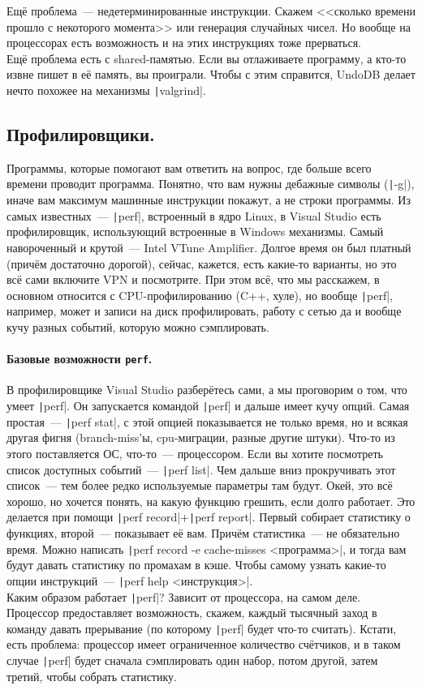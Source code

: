 \documentclass{article}
\begin{document}
    Ещё проблема~--- недетерминированные инструкции. Скажем <<сколько времени прошло с некоторого момента>> или генерация случайных чисел. Но вообще на процессорах есть возможность и на этих инструкциях тоже прерваться.\\
    Ещё проблема есть с shared-памятью. Если вы отлаживаете программу, а кто-то извне пишет в её память, вы проиграли. Чтобы с этим справится, UndoDB делает нечто похожее на механизмы \texttt|valgrind|.
    \subsection{Профилировщики.}
    Программы, которые помогают вам ответить на вопрос, где больше всего времени проводит программа. Понятно, что вам нужны дебажные символы (\texttt|-g|), иначе вам максимум машинные инструкции покажут, а не строки программы. Из самых известных~--- \texttt|perf|, встроенный в ядро Linux, в Visual Studio есть профилировщик, использующий встроенные в Windows механизмы. Самый навороченный и крутой~--- Intel VTune Amplifier. Долгое время он был платный (причём достаточно дорогой), сейчас, кажется, есть какие-то варианты, но это всё сами включите VPN и посмотрите. При этом всё, что мы расскажем, в основном относится с CPU-профилированию (C++, хуле), но вообще \texttt|perf|, например, может и записи на диск профилировать, работу с сетью да и вообще кучу разных событий, которую можно сэмплировать.
    \paragraph{Базовые возможности \texttt{perf}.}
    В профилировщике Visual Studio разберётесь сами, а мы проговорим о том, что умеет \texttt|perf|. Он запускается командой \texttt|perf| и дальше имеет кучу опций. Самая простая~--- \texttt|perf stat|, с этой опцией показывается не только время, но и всякая другая фигня (branch-miss'ы, cpu-миграции, разные другие штуки). Что-то из этого поставляется ОС, что-то~--- процессором. Если вы хотите посмотреть список доступных событий~--- \texttt|perf list|. Чем дальше вниз прокручивать этот список~--- тем более редко используемые параметры там будут. Окей, это всё хорошо, но хочется понять, на какую функцию грешить, если долго работает. Это делается при помощи \texttt|perf record|+\texttt|perf report|. Первый собирает статистику о функциях, второй~--- показывает её вам. Причём статистика~--- не обязательно время. Можно написать \texttt|perf record -e cache-misses <программа>|, и тогда вам будут давать статистику по промахам в кэше. Чтобы самому узнать какие-то опции инструкций~--- \texttt|perf help <инструкция>|.\\
    Каким образом работает \texttt|perf|? Зависит от процессора, на самом деле. Процессор предоставляет возможность, скажем, каждый тысячный заход в команду давать прерывание (по которому \texttt|perf| будет что-то считать). Кстати, есть проблема: процессор имеет ограниченное количество счётчиков, и в таком случае \texttt|perf| будет сначала сэмплировать один набор, потом другой, затем третий, чтобы собрать статистику.
\end{document}
